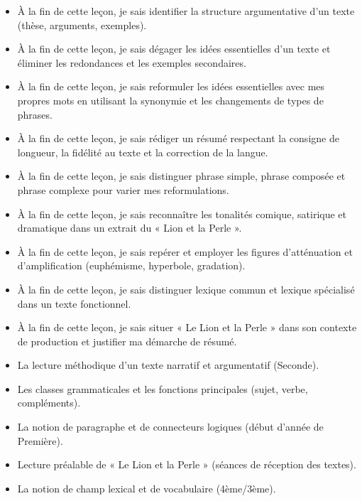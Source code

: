 \documentclass[11pt]{article}
\begin{document}
\begin{objectifs}
\begin{itemize}
\item À la fin de cette leçon, je sais identifier la structure argumentative d'un texte (thèse, arguments, exemples).
\item À la fin de cette leçon, je sais dégager les idées essentielles d'un texte et éliminer les redondances et les exemples secondaires.
\item À la fin de cette leçon, je sais reformuler les idées essentielles avec mes propres mots en utilisant la synonymie et les changements de types de phrases.
\item À la fin de cette leçon, je sais rédiger un résumé respectant la consigne de longueur, la fidélité au texte et la correction de la langue.
\item À la fin de cette leçon, je sais distinguer phrase simple, phrase composée et phrase complexe pour varier mes reformulations.
\item À la fin de cette leçon, je sais reconnaître les tonalités comique, satirique et dramatique dans un extrait du « Lion et la Perle ».
\item À la fin de cette leçon, je sais repérer et employer les figures d'atténuation et d'amplification (euphémisme, hyperbole, gradation).
\item À la fin de cette leçon, je sais distinguer lexique commun et lexique spécialisé dans un texte fonctionnel.
\item À la fin de cette leçon, je sais situer « Le Lion et la Perle » dans son contexte de production et justifier ma démarche de résumé.
\end{itemize}
\end{objectifs}

\begin{prerequis}
\begin{itemize}
\item La lecture méthodique d'un texte narratif et argumentatif (Seconde).
\item Les classes grammaticales et les fonctions principales (sujet, verbe, compléments).
\item La notion de paragraphe et de connecteurs logiques (début d'année de Première).
\item Lecture préalable de « Le Lion et la Perle » (séances de réception des textes).
\item La notion de champ lexical et de vocabulaire (4ème/3ème).
\end{itemize}
\end{prerequis}
\end{document}
